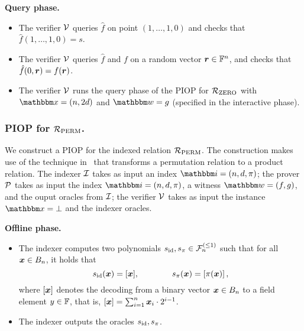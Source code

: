 \textbf{Query phase.}
\begin{itemize}
    \item The verifier $\mathcal{V}$ queries $\hat{f}$ on point $(1, \dots, 1, 0)$ and checks that
        $\hat{f}(1,\dots, 1, 0) = s$.
    \item The verifier $\mathcal{V}$ queries $\hat{f}$ and $f$ on a random vector $\boldsymbol{r} \in \mathbb{F}^n$,
        and checks that $\hat{f}(0, \boldsymbol{r}) = f(\boldsymbol{r})$.
    \item The verifier $\mathcal{V}$ runs the query phase of the PIOP 
    for ${\mathcal{R}}_{\text{ZERO}}$ with $\instR = (n, 2d)$ and $\witR = g$ (specified in the interactive phase).
\end{itemize}

\subsubsection*{PIOP for ${\mathcal{R}}_{\text{PERM}}$.}
We construct a PIOP for the indexed relation ${\mathcal{R}}_{\text{PERM}}$.
The construction makes use of the technique in~\cite{GWC19} that 
transforms a permutation relation to a product relation.
The indexer $\mathcal{I}$ takes as input an index $\idxR = (n, d, \perm)$;
the prover $\mathcal{P}$ takes as input the index $\idxR = (n, d, \perm)$,
a witness $\witR = (f, g)$, and the ouput oracles from $\mathcal{I}$;
the verifier $\mathcal{V}$ takes as input the instance $\instR = \bot$ and 
the indexer oracles.

\textbf{Offline phase.}
\begin{itemize}
    \item The indexer computes two polynomials $s_{\text{id}}, s_{\pi} \in {\mathcal{F}}_{n}^{(\le{1})}$ such that
    for all $\boldsymbol{x} \in B_{n}$, it holds that 
    \[
        s_{\text{id}}(\boldsymbol{x}) = [\boldsymbol{x}], \qquad\qquad s_{\pi}(\boldsymbol{x}) = [\pi(\boldsymbol{x})]\,,
    \]
    where $[\boldsymbol{x}]$ denotes the decoding from a binary vector $\boldsymbol{x} \in B_{n}$
    to a field element $y \in \mathbb{F}$, that is, $[\boldsymbol{x}] = \sum_{i=1}^{n} \boldsymbol{x}_i \cdot 2^{i-1}$.
    \item The indexer outputs the oracles $s_{\text{id}}, s_{\pi}$.
\end{itemize}

